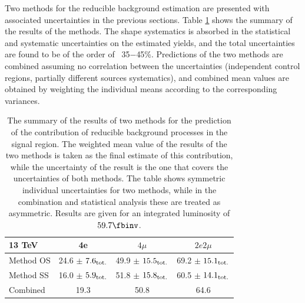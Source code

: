 Two methods for the reducible background estimation are presented with associated uncertainties in the previous sections. Table \ref{tab:reducibleSummary} shows the summary of the results of the methods. 
The shape systematics is absorbed in the statistical and systematic uncertainties on the estimated yields, and the total uncertainties are found to be of the order of ~35$-$45\%. 
Predictions of the two methods are combined assuming no correlation between the uncertainties (independent control regions, partially different sources systematics), and combined mean values are obtained by weighting the individual means according to the corresponding variances. 

\begin{table}[h]
   \centering
    \caption{
    The summary of the results of two methods for the prediction of the contribution of reducible background processes in the signal region. The weighted mean value of the results of the two methods is taken as the final estimate of this contribution, while the uncertainty of the result is the one that covers the uncertainties of both methods. The table shows symmetric individual uncertainties for two methods, while in the combination and statistical analysis these are treated as asymmetric. Results are given for an integrated luminosity of $\usedLumiC$. 
    }
    \begin{tabular}{| l | c | c | c |} \hline
13 TeV                & 4e         & $4\mu$                      & $2e2\mu$       \\ 
\hline \hline
Method OS       & 24.6 $\pm$ $7.6_{\rm tot.}$    & 49.9 $\pm$ $15.5_{\rm tot.}$    & 69.2 $\pm$ $15.1_{\rm tot.}$    \\ 
Method SS       & 16.0 $\pm$ $5.9_{\rm tot.}$    & 51.8 $\pm$ $15.8_{\rm tot.}$    & 60.5 $\pm$ $14.1_{\rm tot.}$    \\   
Combined        & 19.3   & 50.8    & 64.6  \\  
\hline
 \end{tabular}
    \label{tab:reducibleSummary}
\end{table}


